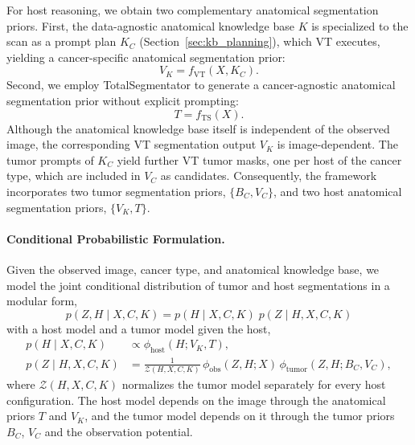 \documentclass[fleqn,10pt]{olplainarticle}
\begin{document}
For host reasoning, we obtain two complementary
anatomical segmentation priors.
First, the data-agnostic anatomical
knowledge base $K$ is specialized to the scan
as a prompt plan $K_C$ (Section~\ref{sec:kb_planning}),
which VT executes, yielding a cancer-specific
anatomical segmentation prior:
\begin{equation}
\label{eq:kb_prior}
V_K = f_{\mathrm{VT}}(X,K_C).
\end{equation}
Second, we employ TotalSegmentator to
generate a cancer-agnostic anatomical segmentation
prior without explicit prompting:
\begin{equation}
\label{eq:ts_prior}
T = f_{\mathrm{TS}}(X).
\end{equation}
Although the anatomical knowledge base itself
is independent of the observed image, the
corresponding VT segmentation output $V_K$
is image-dependent.
The tumor prompts of $K_C$ yield further VT tumor
masks, one per host of the cancer type, which are
included in $V_C$ as candidates.
Consequently, the framework incorporates
two tumor segmentation priors,
$\{B_C,V_C\}$, and two host anatomical
segmentation priors, $\{V_K,T\}$.

\paragraph{Conditional Probabilistic Formulation.}

Given the observed image, cancer type,
and anatomical knowledge base, we model
the joint conditional distribution of
tumor and host segmentations in a
modular form,
\begin{equation}
\label{eq:conditional_joint}
\boxed{
p(Z,H\mid X,C,K)
=
p(H\mid X,C,K)\;
p(Z\mid H,X,C,K)
}
\end{equation}
with a host model and a tumor model given the host,
\begin{equation}
\label{eq:reasoning_potentials}
\begin{aligned}
p(H\mid X,C,K)
&\propto
\phi_{\mathrm{host}}(H;V_K,T),\\
p(Z\mid H,X,C,K)
&=
\frac{1}{\mathcal{Z}(H,X,C,K)}\,
\phi_{\mathrm{obs}}(Z,H;X)\,
\phi_{\mathrm{tumor}}(Z,H;B_C,V_C),
\end{aligned}
\end{equation}
where $\mathcal{Z}(H,X,C,K)$ normalizes
the tumor model separately for every host
configuration.
The host model depends on the image through the
anatomical priors $T$ and $V_K$, and the tumor model
depends on it through the tumor priors $B_C$, $V_C$
and the observation potential.
\end{document}
